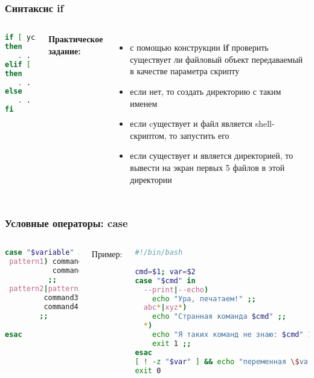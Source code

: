 
\begin{frame}[fragile]
\frametitle{Синтаксис {\bf if}}

	\begin{columns}
	
	\begin{lstlisting}[language=bash]
if [ условие1 ]
then
   . . .
elif [ условие2 ]
then
   . . .
else
   . . .
fi
\end{lstlisting}
	\pause
	{\bf Практическое задание:} \\
	\begin{itemize}

		\item с помощью конструкции {\bf if} проверить существует ли файловый объект передаваемый в качестве параметра скрипту
		\item если нет, то создать директорию с таким именем
		\item если cуществует и файл является shell-скриптом, то запустить его
		\item если существует и является директорией, то вывести на экран первых 5 файлов в этой директории
	\end{itemize}
	\end{columns}
\end{frame}

\begin{frame}[fragile]
\frametitle{Условные операторы: case}

	\small
	\begin{columns}
		\column{0.3\textwidth}

		\begin{lstlisting}[language=sh,frame=single]
case "$variable" in 
 pattern1) command1
           command2
          ;;
 pattern2|pattern3)
         command3
         command4
        ;;

esac
		\end{lstlisting}
		\pause

		\column{0.7\textwidth}
		{\normalsize Пример:}

		\begin{lstlisting}[language=sh]
#!/bin/bash

cmd=$1; var=$2
case "$cmd" in 
  --print|--echo)
    echo "Ура, печатаем!" ;;
  abc*|xyz*)
    echo "Странная команда $cmd" ;;
  *)
    echo "Я таких команд не знаю: $cmd" 1>&2
    exit 1 ;;
esac
[ ! -z "$var" ] && echo "переменная \$var=$var"
exit 0
		\end{lstlisting}


	\end{columns}
\end{frame}

